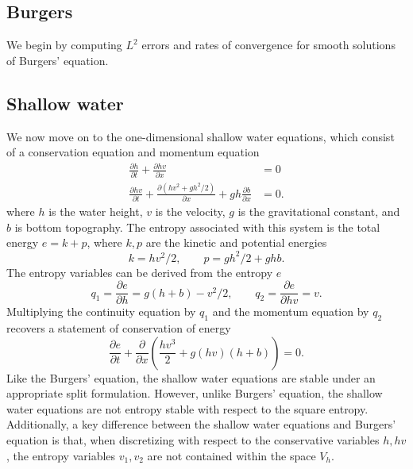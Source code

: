 \documentclass[preprint,10pt]{article}
\theoremstyle{definition}
\theoremstyle{lemma}
\theoremstyle{theorem}
\newcommand{\pd}[2]{\frac{\partial#1}{\partial#2}}
\newcommand{\LRp}[1]{\left( #1 \right)}
\begin{document}
\subsection{Burgers}

We begin by computing $L^2$ errors and rates of convergence for smooth solutions of Burgers' equation.  

\subsection{Shallow water}

We now move on to the one-dimensional shallow water equations, which consist of a conservation equation and momentum equation
\begin{align*}
\pd{h}{t} + \pd{hv}{x} &= 0\\
\pd{hv}{t} + \pd{\LRp{hv^2 + gh^2/2}}{x} + gh\pd{b}{x}&= 0.
\end{align*}
where $h$ is the water height, $v$ is the velocity, $g$ is the gravitational constant, and $b$ is bottom topography.  The entropy associated with this system is the total energy $e = k + p$, where $k, p$ are the kinetic and potential energies
\[
k = hv^2/2, \qquad p = gh^2/2 + ghb.
\]
The entropy variables can be derived from the entropy $e$
\[
q_1 = \pd{e}{h} = g(h+b)-v^2/2, \qquad q_2 = \pd{e}{hv} = v.
\]
Multiplying the continuity equation by $q_1$ and the momentum equation by $q_2$ recovers a statement of conservation of energy
\[
\pd{e}{t} + \pd{}{x}\LRp{\frac{hv^3}{2} + g(hv)(h+b)} = 0.  
\]
Like the Burgers' equation, the shallow water equations are stable under an appropriate split formulation\cite{gassner2016well, chen2017entropy}.  However, unlike Burgers' equation, the shallow water equations are not entropy stable with respect to the square entropy.  Additionally, a key difference between the shallow water equations and Burgers' equation is that, when discretizing with respect to the conservative variables $h, hv$, the entropy variables $v_1,v_2$ are not contained within the space $V_h$.  

%
\end{document}
